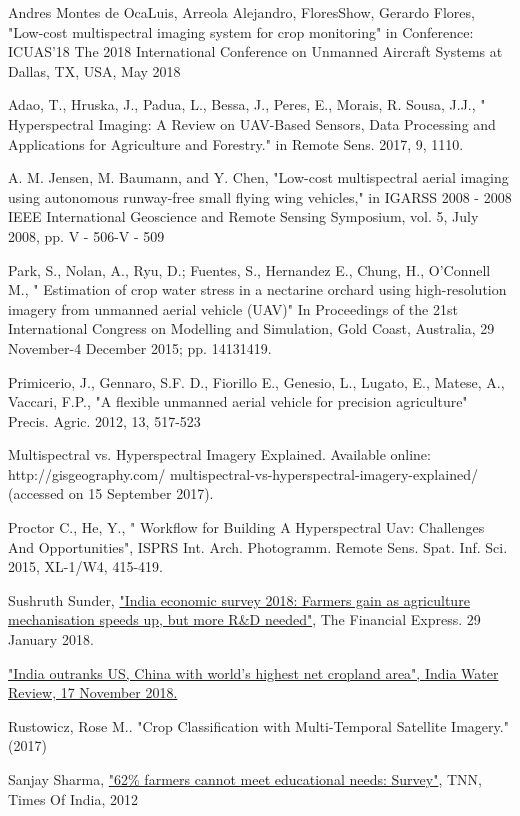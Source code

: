 \begin{thebibliography}{}
Andres Montes de OcaLuis, Arreola Alejandro, FloresShow, Gerardo Flores, "Low-cost multispectral imaging system for crop monitoring" in Conference: ICUAS'18 The 2018 International Conference on Unmanned Aircraft Systems at Dallas, TX, USA, May 2018

Adao, T., Hruska, J., Padua, L., Bessa, J., Peres, E., Morais, R. Sousa, J.J., " Hyperspectral Imaging: A Review on UAV-Based Sensors, Data Processing and Applications for Agriculture and Forestry." in Remote Sens. 2017, 9, 1110. 

A. M. Jensen, M. Baumann, and Y. Chen, "Low-cost multispectral aerial imaging using autonomous runway-free small flying wing vehicles," in IGARSS 2008 - 2008 IEEE International Geoscience and Remote Sensing Symposium, vol. 5, July 2008, pp. V - 506-V - 509

Park, S., Nolan, A., Ryu, D.; Fuentes, S., Hernandez E., Chung, H., O'Connell M., " Estimation of crop water stress in a nectarine orchard using high-resolution imagery from unmanned aerial vehicle (UAV)" In Proceedings of the 21st International Congress on Modelling and Simulation, Gold Coast, Australia, 29 November-4 December 2015; pp. 14131419. 

Primicerio, J., Gennaro, S.F. D., Fiorillo E., Genesio, L., Lugato, E., Matese, A., Vaccari, F.P., "A flexible unmanned aerial vehicle for precision agriculture" Precis. Agric. 2012, 13, 517-523

Multispectral vs. Hyperspectral Imagery Explained. Available online: http://gisgeography.com/ multispectral-vs-hyperspectral-imagery-explained/ (accessed on 15 September 2017). 

Proctor C., He, Y., " Workﬂow for Building A Hyperspectral Uav: Challenges And Opportunities", ISPRS Int. Arch. Photogramm. Remote Sens. Spat. Inf. Sci. 2015, XL-1/W4, 415-419. 

 Sushruth Sunder, \href{https://www.financialexpress.com/budget/india-economic-survey-2018-for-farmers-agriculture-gdp-msp/1034266/}{"India economic survey 2018: Farmers gain as agriculture mechanisation speeds up, but more R\&D needed"}, The Financial Express. 29 January 2018.  

\href{http://www.indiawaterreview.in/Story/Features/india-outranks-us-china-with-worlds-highest-net-cropland-area/2096/2#.W_A_iOgzZPY}{"India outranks US, China with world's highest net cropland area", India Water Review, 17 November 2018.}

Rustowicz, Rose M.. "Crop Classification with Multi-Temporal Satellite Imagery." (2017)

Sanjay Sharma, \href{https://timesofindia.indiatimes.com/india/62-farmers-cannot-meet-educational-needs-Survey/articleshow/12049496.cms}{"62\% farmers cannot meet educational needs: Survey"}, TNN, Times Of India, 2012


\end{thebibliography}
